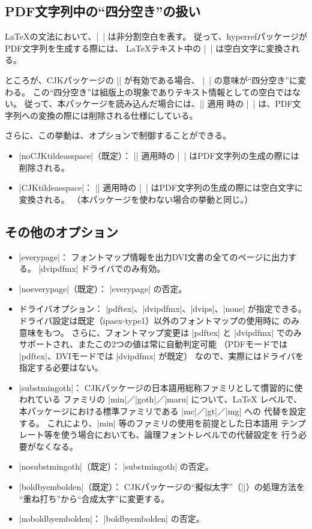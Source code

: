 \documentclass[a4paper]{ltjsarticle}
\newcommand{\Pkg}[1]{\textsf{#1}}
\newcommand{\Means}{：\quad}
\begin{document}
\subsection{PDF文字列中の“四分空き”の扱い}

{\LaTeX}の文法において、|~| は非分割空白を表す。
従って、\Pkg{hyperref}パッケージがPDF文字列を生成する際には、
{\LaTeX}テキスト中の |~| は空白文字に変換される。

ところが、\Pkg{CJK}パッケージの |\CJKtilde| が有効である場合、
|~| の意味が“四分空き”に変わる。
この“四分空き”は組版上の現象でありテキスト情報としての空白ではない。
従って、本パッケージを読み込んだ場合には、|\CJKtilde| 適用
時の |~| は、PDF文字列への変換の際には削除される仕様にしている。

さらに、この挙動は、オプションで制御することができる。

\begin{itemize}
\item |noCJKtildeasspace|（既定）\Means
  |\CJKtilde| 適用時の |~| はPDF文字列の生成の際には削除される。
\item |CJKtildeasspace|\Means
  |\CJKtilde| 適用時の |~| はPDF文字列の生成の際には空白文字に
  変換される。
  （本パッケージを使わない場合の挙動と同じ。）
\end{itemize}

\subsection{その他のオプション}

\begin{itemize}
\item |everypage|\Means
  フォントマップ情報を出力DVI文書の全てのページに出力する。
  |dvipdfmx| ドライバでのみ有効。
\item |noeverypage|（既定）\Means
  |everypage| の否定。
\item ドライバオプション\Means
  |pdftex|、|dvipdfmx|、|dvips|、|none| が指定できる。
  ドライバ設定は既定（ipaex-type1）以外のフォントマップの使用時に
  のみ意味をもつ。
  さらに、フォントマップ変更は |pdftex| と |dvipdfmx| でのみ
  サポートされ、またこの2つの値は常に自動判定可能
  （PDFモードでは |pdftex|、DVIモードでは |dvipdfmx| が既定）
  なので、実際にはドライバを指定する必要はない。
\item |substmingoth|\Means
  CJKパッケージの日本語用総称ファミリとして慣習的に使われている
  ファミリの |min|／|goth|／|maru| について、{\LaTeX} レベルで、
  本パッケージにおける標準ファミリである |mc|／|gt|／|mg| への
  代替を設定する。
  これにより、|min| 等のファミリの使用を前提とした日本語用
  テンプレート等を使う場合においても、論理フォントレベルでの代替設定を
  行う必要がなくなる。
\item |nosubstmingoth|（既定）\Means
  |substmingoth| の否定。
\item |boldbyembolden|（既定）\Means
  \Pkg{CJK}パッケージの“擬似太字”（|\CJKbold|）の処理方法を
  “重ね打ち”から“合成太字”に変更する。
\item |noboldbyembolden|\Means
  |boldbyembolden| の否定。
\end{itemize}
\end{document}
